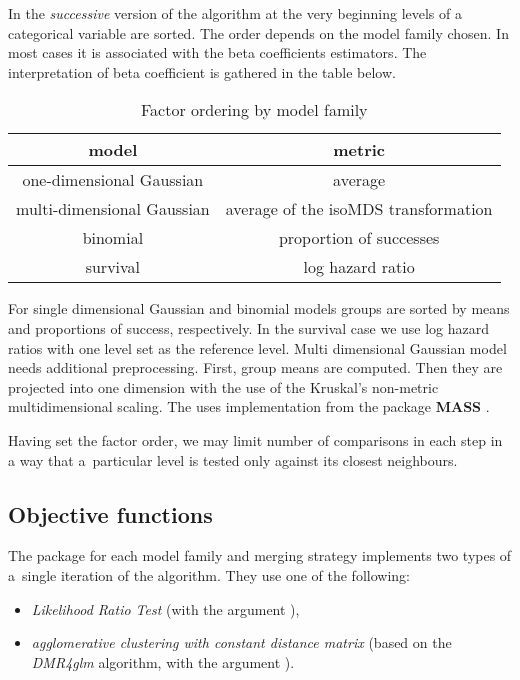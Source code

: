 In the \emph{successive} version of the algorithm at the very beginning levels of a categorical variable are sorted. The order depends on the model family chosen. In most cases it is associated with the beta coefficients estimators. The interpretation of beta coefficient is gathered in the table below.

\begin{table}[H]
\centering \begin{tabular}[t]{c|c}
\hline \textbf{model} & \textbf{metric} \\
\hline one-dimensional Gaussian & average \\
\hline multi-dimensional Gaussian & average of the isoMDS transformation \\
\hline binomial & proportion of successes \\
\hline survival & log hazard ratio \\
\hline 

\end{tabular}
\caption{\label{tab:}Factor ordering by model family}

\end{table}

For single dimensional Gaussian and binomial models groups are sorted by means and proportions of success, respectively. In the survival case we use log hazard ratios with one level set as the reference level. Multi dimensional Gaussian model needs additional preprocessing. First, group means are computed. Then they are projected into one dimension with the use of the Kruskal's non-metric multidimensional scaling. The \factorMerger uses  implementation from the package \textbf{MASS} \citep{MASS}. 

Having set the factor order, we may limit number of comparisons in each step in a way that a~particular level is tested only against its closest neighbours.



\subsection{Objective functions}

The \factorMerger package for each model family and merging strategy implements two types of a~single iteration of the algorithm. They use one of the following:

\begin{itemize}

\item \emph{Likelihood Ratio Test} (with the argument ),
\item \emph{agglomerative clustering with constant distance matrix} (based on the \emph{DMR4glm} algorithm, with the argument ). 

\end{itemize}




